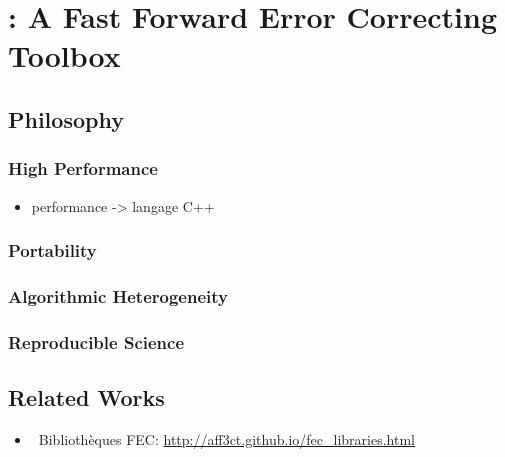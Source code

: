 \graphicspath{{main/chapter4/fig/}}

\chapter{\AFFECT: A Fast Forward Error Correcting Toolbox}

\minitoccustom

\section{Philosophy}

\subsection{High Performance}

\begin{itemize}
  \item performance -> langage C++
\end{itemize}

\subsection{Portability}

\subsection{Algorithmic Heterogeneity}

\subsection{Reproducible Science}

\section{Related Works}

\begin{itemize}
  \item \cmark~Bibliothèques FEC: \url{http://aff3ct.github.io/fec_libraries.html}
\end{itemize}

